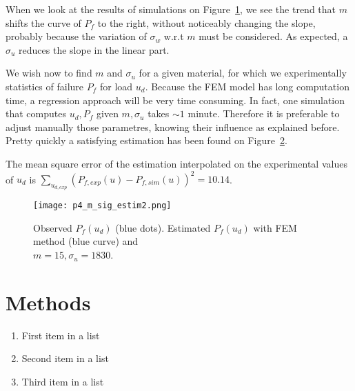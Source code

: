 \documentclass[
10pt, %
a4paper, %
oneside, %
headinclude,footinclude, %
BCOR5mm, %
]{scrartcl}
\begin{document}
When we look at the results of simulations on Figure~\ref{fig:var-m-sigu}, we see the trend that $m$
shifts the curve of $P_f$ to the right, without noticeably changing
the slope, probably because the variation of $\sigma_w$ w.r.t $m$ must
be considered. As expected, a $\sigma_u$ reduces the slope in the
linear part.

\begin{figure}[H]
    \centering
    \hfill
    \label{fig:var-m-sigu}
\end{figure}


We wish now to find $m$ and $\sigma_u$ for a given material, for which
we experimentally statistics of failure $P_f$ for load $u_d$.
Because the FEM model has long computation time, a regression approach
will be very time consuming.
In fact, one simulation that computes
$u_d,P_f$ given $m,\sigma_u$ takes $\sim 1$ minute.
Therefore it is preferable to adjust manually those parametres, knowing
their influence as explained before. Pretty quickly a satisfying
estimation has been found on Figure~\ref{fig:estim-m-sigu}.

The mean square error of the estimation interpolated on the experimental
values of $u_d$ is $\displaystyle \sum_{u_{d,exp}}\left(P_{f,exp}(u) - P_{f,sim}(u)\right)^2 = 10.14$.

\begin{figure}[H]
    \centering
    \texttt{[image: p4\_m\_sig\_estim2.png]}
    \caption{Observed $P_f(u_d)$ (blue dots). Estimated $P_f(u_d)$ with FEM method (blue curve) and \\ $m=15,\sigma_u=1830$.}
    \label{fig:estim-m-sigu}
\end{figure}


\section{Methods}

\lipsum[5] %

\begin{enumerate}[noitemsep] %
    \item First item in a list
    \item Second item in a list
    \item Third item in a list
\end{enumerate}
\end{document}
